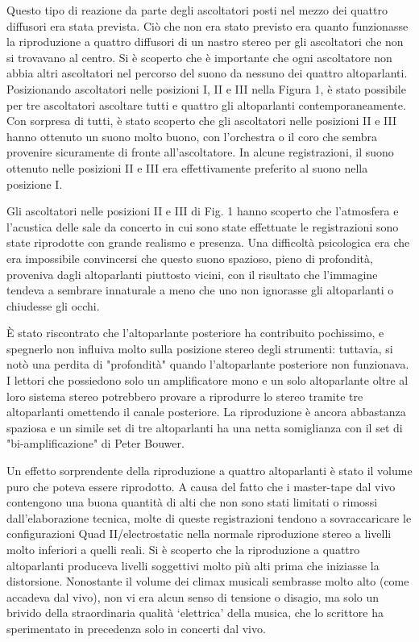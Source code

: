 \documentclass[11pt]{article}
\begin{document}
\begin{multicols*}{2}
Questo tipo di reazione da parte degli ascoltatori posti nel mezzo dei quattro diffusori era stata prevista. Ciò che non era stato previsto era quanto funzionasse la riproduzione a quattro diffusori di un nastro stereo per gli ascoltatori che non si trovavano al centro. Si è scoperto che è importante che ogni ascoltatore non abbia altri ascoltatori nel percorso del suono da nessuno dei quattro altoparlanti. Posizionando ascoltatori nelle posizioni I, II e III nella Figura 1, è stato possibile per tre ascoltatori ascoltare tutti e quattro gli altoparlanti contemporaneamente. Con sorpresa di tutti, è stato scoperto che gli ascoltatori nelle posizioni II e III hanno ottenuto un suono molto buono, con l'orchestra o il coro che sembra provenire sicuramente di fronte all'ascoltatore. In alcune registrazioni, il suono ottenuto nelle posizioni II e III era effettivamente preferito al suono nella posizione I.

Gli ascoltatori nelle posizioni II e III di Fig. 1 hanno scoperto che l'atmosfera e l'acustica delle sale da concerto in cui sono state effettuate le registrazioni sono state riprodotte con grande realismo e presenza. Una difficoltà psicologica era che era impossibile convincersi che questo suono spazioso, pieno di profondità, proveniva dagli altoparlanti piuttosto vicini, con il risultato che l'immagine tendeva a sembrare innaturale a meno che uno non ignorasse gli altoparlanti o chiudesse gli occhi.

È stato riscontrato che l'altoparlante posteriore ha contribuito pochissimo, e spegnerlo non influiva molto sulla posizione stereo degli strumenti: tuttavia, si notò una perdita di "profondità" quando l'altoparlante posteriore non funzionava. I lettori che possiedono solo un amplificatore mono e un solo altoparlante oltre al loro sistema stereo potrebbero provare a riprodurre lo stereo tramite tre altoparlanti omettendo il canale posteriore. La riproduzione è ancora abbastanza spaziosa e un simile set di tre altoparlanti ha una netta somiglianza con il set di "bi-amplificazione" di Peter Bouwer.

Un effetto sorprendente della riproduzione a quattro altoparlanti è stato il volume puro che poteva essere riprodotto. A causa del fatto che i master-tape dal vivo contengono una buona quantità di alti che non sono stati limitati o rimossi dall'elaborazione tecnica, molte di queste registrazioni tendono a sovraccaricare le configurazioni Quad II/electrostatic nella normale riproduzione stereo a livelli molto inferiori a quelli reali. Si è scoperto che la riproduzione a quattro altoparlanti produceva livelli soggettivi molto più alti prima che iniziasse la distorsione. Nonostante il volume dei climax musicali sembrasse molto alto (come accadeva dal vivo), non vi era alcun senso di tensione o disagio, ma solo un brivido della straordinaria qualità ‘elettrica’ della musica, che lo scrittore ha sperimentato in precedenza solo in concerti dal vivo.


\end{multicols*}
\end{document}

